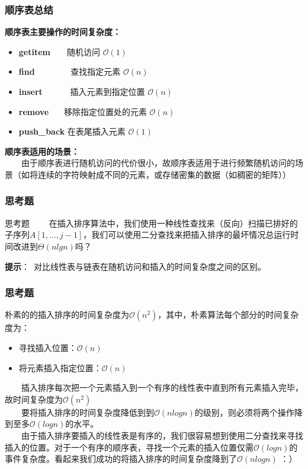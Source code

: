 \documentclass{beamer}
\begin{document}
	\begin{frame}\frametitle{顺序表总结}
		\textbf{顺序表主要操作的时间复杂度：}
		\begin{itemize}
			\item \textbf{getitem}\ \ \ \  随机访问 $\mathcal{O}(1)$
			\item \textbf{find} \ \ \ \ \ \ \ \ 查找指定元素 $\mathcal{O}(n)$
			\item \textbf{insert} \ \ \ \ \ \ 插入元素到指定位置 $\mathcal{O}(n)$
			\item \textbf{remove} \ \ \ 移除指定位置处的元素 $\mathcal{O}(n)$
			\item \textbf{push\_back} 在表尾插入元素 $\mathcal{O}(1)$
		\end{itemize} 
		\textbf{顺序表适用的场景：} \\
		\ \ \ \ 由于顺序表进行随机访问的代价很小，故顺序表适用于进行频繁随机访问的场景（如将连续的字符映射成不同的元素，或存储密集的数据（如稠密的矩阵））
	\end{frame}
	\begin{frame}\frametitle{思考题}
		\begin{block}{思考题}
			\ \ \ \ 在插入排序算法中，我们使用一种线性查找来（反向）扫描已排好的子序列$A[1,\dots, j-1]$，我们可以使用二分查找来把插入排序的最坏情况总运行时间改进到$\Theta(nlgn)$吗？
		\end{block}
		\textbf{提示}：\ 对比线性表与链表在随机访问和插入的时间复杂度之间的区别。
	\end{frame}
	\begin{frame}\frametitle{思考题}
	朴素的的插入排序的时间复杂度为$\mathcal{O}(n^2)$，其中，朴素算法每个部分的时间复杂度为：
	\begin{itemize}
		\item 寻找插入位置：$\mathcal{O}(n)$
		\item 将元素插入指定位置：$\mathcal{O}(n)$
	\end{itemize}
	\ \ \ \ 插入排序每次把一个元素插入到一个有序的线性表中直到所有元素插入完毕，故时间复杂度为$\mathcal{O}(n^2)$ \\
	\ \ \ \ 要将插入排序的时间复杂度降低到到$\mathcal{O}(nlogn)$的级别，则必须将两个操作降到至多$\mathcal{O}(logn)$的水平。\\
	\ \ \ \ 由于插入排序要插入的线性表是有序的，我们很容易想到使用二分查找来寻找插入的位置。对于一个有序的顺序表，寻找一个元素的插入位置仅需$\mathcal{O}(logn)$的事件复杂度。看起来我们成功的将插入排序的时间复杂度降到了$\mathcal{O}(nlogn)$ ：）
	\end{frame}
\end{document}
